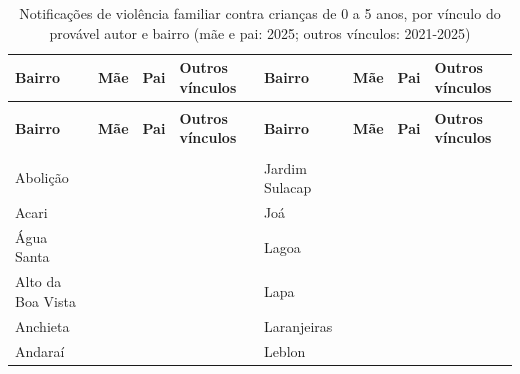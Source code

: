 \begin{apendicesenv}
{\renewcommand{\arraystretch}{1.0}
{\footnotesize\setlength{\tabcolsep}{3.5pt}
\begin{longtable}{@{}>{\raggedright\arraybackslash}p{2.95cm}>{\raggedleft\arraybackslash}p{1.25cm}>{\raggedleft\arraybackslash}p{1.25cm}>{\raggedleft\arraybackslash}p{1.25cm}@{\hspace{0.6cm}}>{\raggedright\arraybackslash}p{2.95cm}>{\raggedleft\arraybackslash}p{1.25cm}>{\raggedleft\arraybackslash}p{1.25cm}>{\raggedleft\arraybackslash}p{1.25cm}@{}}
\caption{Notificações de violência familiar contra crianças de 0 a 5 anos, por vínculo do provável autor e bairro (mãe e pai: 2025; outros vínculos: 2021-2025)}\label{tab:violencia-familiar-taxa-por-bairro}\\
\toprule \hyphenpenalty=10000\exhyphenpenalty=10000\textbf{Bairro} & \hyphenpenalty=10000\exhyphenpenalty=10000\textbf{Mãe} & \hyphenpenalty=10000\exhyphenpenalty=10000\textbf{Pai} & \hyphenpenalty=10000\exhyphenpenalty=10000\textbf{Outros vínculos} & \hyphenpenalty=10000\exhyphenpenalty=10000\textbf{Bairro} & \hyphenpenalty=10000\exhyphenpenalty=10000\textbf{Mãe} & \hyphenpenalty=10000\exhyphenpenalty=10000\textbf{Pai} & \hyphenpenalty=10000\exhyphenpenalty=10000\textbf{Outros vínculos} \\ \midrule \endfirsthead
\multicolumn{8}{@{}l}{\footnotesize\itshape (continuação)}\\ \toprule \hyphenpenalty=10000\exhyphenpenalty=10000\textbf{Bairro} & \hyphenpenalty=10000\exhyphenpenalty=10000\textbf{Mãe} & \hyphenpenalty=10000\exhyphenpenalty=10000\textbf{Pai} & \hyphenpenalty=10000\exhyphenpenalty=10000\textbf{Outros vínculos} & \hyphenpenalty=10000\exhyphenpenalty=10000\textbf{Bairro} & \hyphenpenalty=10000\exhyphenpenalty=10000\textbf{Mãe} & \hyphenpenalty=10000\exhyphenpenalty=10000\textbf{Pai} & \hyphenpenalty=10000\exhyphenpenalty=10000\textbf{Outros vínculos} \\ \midrule \endhead
\midrule \multicolumn{8}{r@{}}{\footnotesize\itshape (continua)}\\ \endfoot
\bottomrule \endlastfoot
Abolição & 2 & 2 & 0 & Jardim Sulacap & 1 & 2 & 1 \\
Acari & 17 & 16 & 4 & Joá & 11 & 10 & 2 \\
Água Santa & 6 & 6 & 0 & Lagoa & 0 & 0 & 0 \\
Alto da Boa Vista & 0 & 0 & 0 & Lapa & 0 & 0 & 0 \\
Anchieta & 0 & 0 & 2 & Laranjeiras & 0 & 0 & 0 \\
Andaraí & 0 & 0 & 0 & Leblon & 2 & 1 & 0 \\

\end{longtable}}}
\end{apendicesenv}
